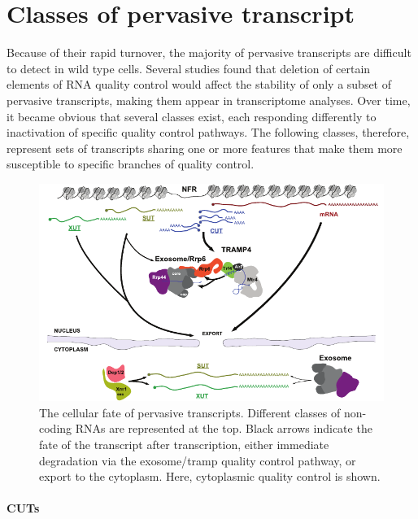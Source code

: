 \section{Classes of pervasive transcript} \label{pervasiveTranscripts}

Because of their rapid turnover, the majority of pervasive transcripts are difficult to detect in wild type cells. 
Several studies found that deletion of certain elements of RNA quality control would affect the stability of only a subset of pervasive transcripts, making them appear in transcriptome analyses. 
Over time, it became obvious that several classes exist, each responding differently to inactivation of specific quality control pathways. 
The following classes, therefore, represent sets of transcripts sharing one or more features that make them more susceptible to specific branches of quality control.

\begin{figure}[ht]

\centering
\includegraphics[width=\textwidth]{figures/introduction/pervasiveTr}
\caption[Classes of transcripts and their fates.]{The cellular fate of pervasive transcripts. Different classes of non-coding RNAs are represented at the top. Black arrows indicate the fate of the transcript after transcription, either immediate degradation via the exosome/\gls{tramp} quality control pathway, or export to the cytoplasm. Here, cytoplasmic quality control is shown.}
\label{fig:pervasiveTranscripts}

\end{figure}


\paragraph{CUTs}

